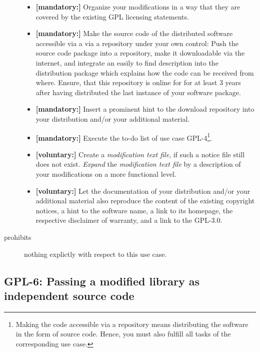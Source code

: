 \begin{description}
\begin{itemize}
  \item \textbf{[mandatory:]} Organize your modifications in a way that they are
  covered by the existing GPL licensing statements.
  
  \item \textbf{[mandatory:]} Make the source code of the distributed software
  accessible via a via a repository under your own control: Push the source code
  package into a repository, make it downloadable via the internet, and
  integrate an easily to find description into the distribution package which
  explains how the code can be received from where. Ensure, that this repository
  is online for for at least 3 years after having distributed the last instance
  of your software package.
  
  \item \textbf{[mandatory:]} Insert a prominent hint to the download repository
  into your distribution and/or your additional material.
  
  \item \textbf{[mandatory:]} Execute the to-do list of use case GPL-4\footnote{
  Making the code accessible via a repository means distributing the software in
  the form of source code. Hence, you must also fulfill all tasks of the
  corresponding use case.}.

  
  \item \textbf{[voluntary:]} Create a \emph{modification text file}, if such a
  notice file still does not exist. \emph{Expand} the \emph{modification text
  file} by a description of your modifications on a more functional level.
      
  \item \textbf{[voluntary:]} Let the documentation of your distribution and/or
  your additional material also reproduce the content of the existing
  copyright notices, a hint to the software name, a link to its homepage,
  the respective disclaimer of warranty, and a link to the GPL-3.0.


\end{itemize}

\item[prohibits] nothing explictly with respect to this use case.

\end{description}

\subsection{GPL-6: Passing a modified library as independent source code}
\label{OSUC-08S-GPL}

